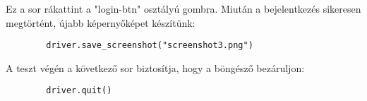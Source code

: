 \documentclass[12pt]{article}
\begin{document}
	Ez a sor rákattint a "login-btn" osztályú gombra. Miután a bejelentkezés sikeresen megtörtént, újabb képernyőképet készítünk:
	
	\begin{lstlisting}
		driver.save_screenshot("screenshot3.png")
	\end{lstlisting}
	
	A teszt végén a következő sor biztosítja, hogy a böngésző bezáruljon:
	
	\begin{lstlisting}
		driver.quit()
	\end{lstlisting}
	
\end{document}
